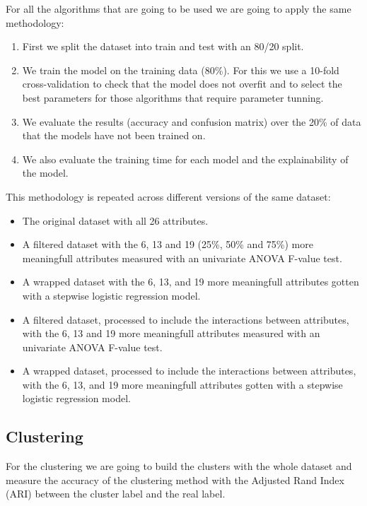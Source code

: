 \documentclass[a4paper,11pt]{article}
\begin{document}
For all the algorithms that are going to be used we are going to apply the same methodology:

\begin{enumerate}
	\item First we split the dataset into train and test with an 80/20 split.
	\item We train the model on the training data (80\%). For this we use a 10-fold cross-validation to check that the model does not overfit and to select the best parameters for those algorithms that require parameter tunning.
	\item We evaluate the results (accuracy and confusion matrix) over the 20\% of data that the models have not been trained on.
	\item We also evaluate the training time for each model and the explainability of the model.
\end{enumerate}

This methodology is repeated across different versions of the same dataset:

\begin{itemize}
	\item The original dataset with all 26 attributes.
	\item A filtered dataset with the 6, 13 and 19 (25\%, 50\% and 75\%) more meaningfull attributes measured with an univariate ANOVA F-value test.
	\item A wrapped dataset with the 6, 13, and 19 more meaningfull attributes gotten with a stepwise logistic regression model.
	\item A filtered dataset, processed to include the interactions between attributes, with the 6, 13 and 19 more meaningfull attributes  measured with an univariate ANOVA F-value test.
	\item A wrapped dataset, processed to include the interactions between attributes, with the 6, 13, and 19 more meaningfull attributes gotten with a stepwise logistic regression model.
\end{itemize}

\subsection{Clustering}

For the clustering we are going to build the clusters with the whole dataset and measure the accuracy of the clustering method with the Adjusted Rand Index (ARI) between the cluster label and the real label.
\end{document}
